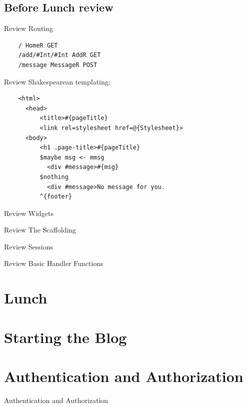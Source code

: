 \documentclass[pdf]{beamer}
\begin{document}
\subsection{Before Lunch review}
\begin{frame}[fragile]{Review}
  Routing\\
  \begin{verbatim}
    / HomeR GET
    /add/#Int/#Int AddR GET
    /message MessageR POST
  \end{verbatim}
\end{frame}
\begin{frame}[fragile]{Review}
  Shakespearean templating:\\
  \begin{verbatim}
    <html>
      <head>
          <title>#{pageTitle}
          <link rel=stylesheet href=@{Stylesheet}>
      <body>
          <h1 .page-title>#{pageTitle}
          $maybe msg <- mmsg
            <div #message>#{msg}
          $nothing
            <div #message>No message for you.
          ^{footer}
  \end{verbatim}
\end{frame}
\begin{frame}[fragile]{Review}
  Widgets\\
\end{frame}
\begin{frame}[fragile]{Review}
  The Scaffolding\\
\end{frame}
\begin{frame}[fragile]{Review}
  Sessions\\
\end{frame}
\begin{frame}[fragile]{Review}
  Basic Handler Functions\\
\end{frame}

\section{Lunch}

\section{Starting the Blog}

\section{Authentication and Authorization}
\begin{frame}{Authentication and Authorization}
  
\end{frame}
\end{document}
